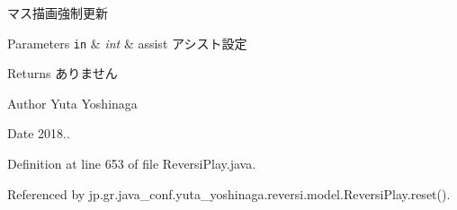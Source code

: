 マス描画強制更新 


\begin{DoxyParams}[1]{Parameters}
\mbox{\tt in}  & {\em int} & assist アシスト設定 \\
\hline
\end{DoxyParams}
\begin{DoxyReturn}{Returns}
ありません 
\end{DoxyReturn}
\begin{DoxyAuthor}{Author}
Yuta Yoshinaga 
\end{DoxyAuthor}
\begin{DoxyDate}{Date}
2018.. 
\end{DoxyDate}


Definition at line 653 of file Reversi\+Play.\+java.



Referenced by jp.\+gr.\+java\+\_\+conf.\+yuta\+\_\+yoshinaga.\+reversi.\+model.\+Reversi\+Play.\+reset().

